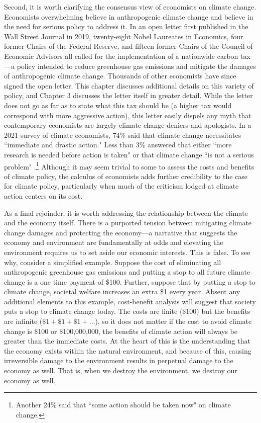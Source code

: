 Second, it is worth clarifying the consensus view of economists on climate change. Economists overwhelming believe in anthropogenic climate change and believe in the need for serious policy to address it. In an open letter first published in the Wall Street Journal in 2019, twenty-eight Nobel Laureates in Economics, four former Chairs of the Federal Reserve, and fifteen former Chairs of the Council of Economic Advisors all called for the implementation of a nationwide carbon tax---a policy intended to reduce greenhouse gas emissions and mitigate the damages of anthropogenic climate change. Thousands of other economists have since signed the open letter. This chapter discusses additional details on this variety of policy, and Chapter 3 discusses the letter itself in greater detail. While the letter does not go as far as to state what this tax should be (a higher tax would correspond with more aggressive action), this letter easily dispels any myth that contemporary economists are largely climate change deniers and apologists. In a 2021 survey of climate economists, 74\% said that climate change necessitates ``immediate and drastic action." Less than 3\% answered that either ``more research is needed before action is taken" or that climate change ``is not a serious problem" \citep{howard2021gauging}.\footnote{Another 24\% said that ``some action should be taken now" on climate change.} Although it may seem trivial to some to assess the costs and benefits of climate policy, the calculus of economists adds further credibility to the case for climate policy, particularly when much of the criticism lodged at climate action centers on its cost. 

As a final rejoinder, it is worth addressing the relationship between the climate and the economy itself. There is a purported tension between mitigating climate change damages and protecting the economy---a narrative that suggests the economy and environment are fundamentally at odds and elevating the environment requires us to set aside our economic interests. This is false. To see why, consider a simplified example. Suppose the cost of eliminating all anthropogenic greenhouse gas emissions and putting a stop to all future climate change is a one time payment of \$100. Further, suppose that by putting a stop to climate change, societal welfare increases an extra \$1 every year. Absent any additional elements to this example, cost-benefit analysis will suggest that society puts a stop to climate change today. The costs are finite (\$100) but the benefits are infinite ($\$1  + \$1  + \$1 + \ldots$), so it does not matter if the cost to avoid climate change is \$100 or \$100,000,000, the benefits of climate action will always be greater than the immediate costs. At the heart of this is the understanding that the economy exists within the natural environment, and because of this, causing irreversible damage to the environment results in perpetual damage to the economy as well. That is, when we destroy the environment, we destroy our economy as well. 

